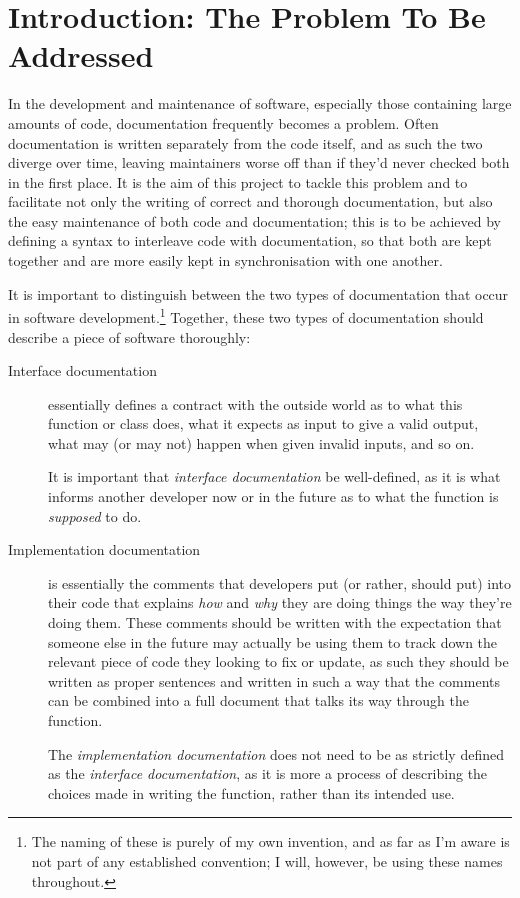 \section{Introduction: The Problem To Be Addressed}

In the development and maintenance of software, especially those
containing large amounts of code, documentation frequently becomes a
problem. Often documentation is written separately from the code
itself, and as such the two diverge over time, leaving maintainers
worse off than if they'd never checked both in the first place. It is
the aim of this project to tackle this problem and to facilitate not
only the writing of correct and thorough documentation, but also the
easy maintenance of both code and documentation; this is to be
achieved by defining a syntax to interleave code with documentation,
so that both are kept together and are more easily kept in
synchronisation with one another.

It is important to distinguish between the two types of documentation
that occur in software development.\footnote{The naming of these is
purely of my own invention, and as far as I'm aware is not part of any
established convention; I will, however, be using these names
throughout.} Together, these two types of documentation should
describe a piece of software thoroughly:

\begin{description}
\item[Interface documentation] essentially defines a contract with the
  outside world as to what this function or class does, what it
  expects as input to give a valid output, what may (or may not)
  happen when given invalid inputs, and so on.

  It is important that \emph{interface documentation} be well-defined,
  as it is what informs another developer now or in the future as to
  what the function is \emph{supposed} to do.

\item[Implementation documentation] is essentially the comments that
  developers put (or rather, should put) into their code that explains
  \emph{how} and \emph{why} they are doing things the way they're
  doing them. These comments should be written with the expectation
  that someone else in the future may actually be using them to track
  down the relevant piece of code they looking to fix or update, as
  such they should be written as proper sentences and written in such
  a way that the comments can be combined into a full document that
  talks its way through the function.

  The \emph{implementation documentation} does not need to be as
  strictly defined as the \emph{interface documentation}, as it is
  more a process of describing the choices made in writing the
  function, rather than its intended use.
\end{description}

